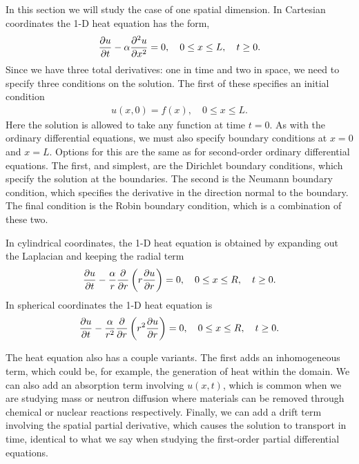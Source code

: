 In this section we will study the case of one spatial dimension. In Cartesian coordinates the 1-D heat equation has the form,
\begin{align}
  \frac{ \partial {u} }{ \partial {t} } - \alpha \frac{ \partial^2 {u} }{ \partial {x}^2 } = 0, \quad 0 \le x \le L, \quad t \ge 0 .
\end{align}
Since we have three total derivatives: one in time and two in space, we need to specify three conditions on the solution. The first of these specifies an initial condition
\begin{align}
  u(x,0) = f(x), \quad 0 \le x \le L .
\end{align}
Here the solution is allowed to take any function at time $t = 0$. As with the ordinary differential equations, we must also specify boundary conditions at $x = 0$ and $x = L$. Options for this are the same as for second-order ordinary differential equations. The first, and simplest, are the Dirichlet boundary conditions, which specify the solution at the boundaries. The second is the Neumann boundary condition, which specifies the derivative in the direction normal to the boundary. The final condition is the Robin boundary condition, which is a combination of these two.

In cylindrical coordinates, the 1-D heat equation is obtained by expanding out the Laplacian and keeping the radial term
\begin{align}
  \frac{ \partial {u} }{ \partial {t} } - \frac{\alpha}{r} \frac{ \partial {} }{ \partial {r} } \left( r \frac{ \partial {u} }{ \partial {r} } \right) = 0, \quad 0 \le x \le R, \quad t \ge 0 .
\end{align}
In spherical coordinates the 1-D heat equation is
\begin{align}
  \frac{ \partial {u} }{ \partial {t} } - \frac{\alpha}{r^2} \frac{ \partial {} }{ \partial {r} } \left( r^2 \frac{ \partial {u} }{ \partial {r} } \right) = 0, \quad 0 \le x \le R, \quad t \ge 0 .
\end{align}

The heat equation also has a couple variants. The first adds an inhomogeneous term, which could be, for example, the generation of heat within the domain. We can also add an absorption term involving $u(x,t)$, which is common when we are studying mass or neutron diffusion where materials can be removed through chemical or nuclear reactions respectively. Finally, we can add a drift term involving the spatial partial derivative, which causes the solution to transport in time, identical to what we say when studying the first-order partial differential equations.


